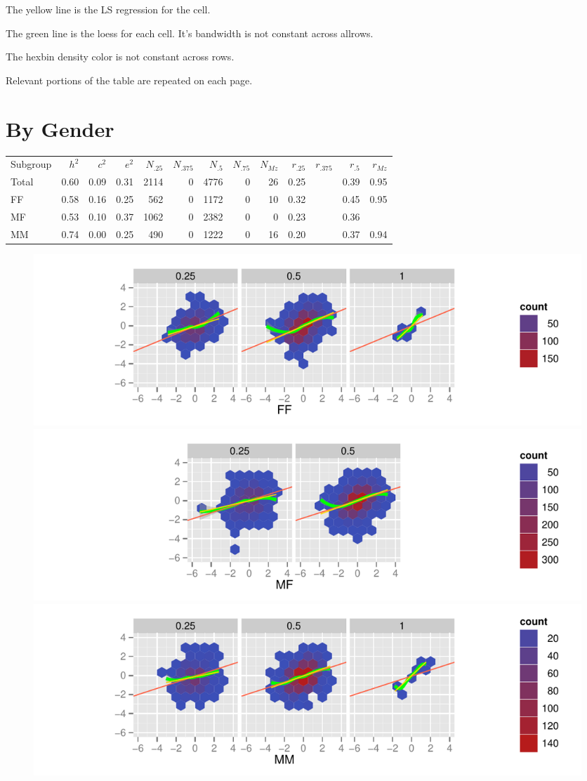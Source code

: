 \documentclass[a4paper]{article}
\begin{document}
The yellow line is the LS regression for the cell.

The green line is the loess for each cell.  It's bandwidth is not constant across allrows.

The hexbin density color is not constant across rows.

Relevant portions of the table are repeated on each page.
\newpage
\section{By Gender}
\begin{table}[ht]
\begin{center}
\begin{tabular}{l|rrr|rrrrr|rrrr}
 Subgroup & $h^2$ & $c^2$ & $e^2$ & $N_{.25}$ & $N_{.375}$ & $N_{.5}$ & $N_{.75}$ & $N_{Mz}$ & $r_{.25}$ & $r_{.375}$ & $r_{.5}$ & $r_{Mz}$ \\ 
 Total & 0.60 & 0.09 & 0.31 & 2114 &   0 & 4776 &   0 &  26 & 0.25 &  & 0.39 & 0.95 \\ 
   \hline
FF & 0.58 & 0.16 & 0.25 & 562 &   0 & 1172 &   0 &  10 & 0.32 &  & 0.45 & 0.95 \\ 
  MF & 0.53 & 0.10 & 0.37 & 1062 &   0 & 2382 &   0 &   0 & 0.23 &  & 0.36 &  \\ 
  MM & 0.74 & 0.00 & 0.25 & 490 &   0 & 1222 &   0 &  16 & 0.20 &  & 0.37 & 0.94 \\ 
  \end{tabular}
\end{center}
\end{table}\begin{figure}[htbp]
\includegraphics{Height-006}
\includegraphics{Height-007}
\includegraphics{Height-008}
\end{figure}
\end{document}

